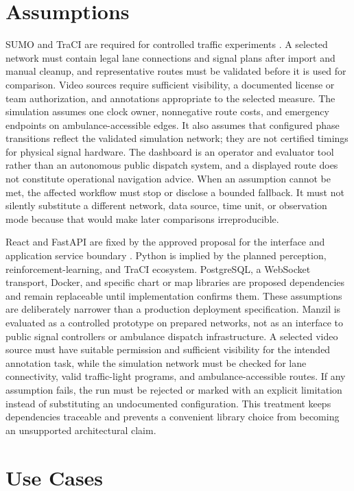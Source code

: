 \section{Assumptions}

SUMO and TraCI are required for controlled traffic experiments \cite{lopez2018sumo,sumodocs}. A selected network must contain legal lane connections and signal plans after import and manual cleanup, and representative routes must be validated before it is used for comparison. Video sources require sufficient visibility, a documented license or team authorization, and annotations appropriate to the selected measure. The simulation assumes one clock owner, nonnegative route costs, and emergency endpoints on ambulance-accessible edges. It also assumes that configured phase transitions reflect the validated simulation network; they are not certified timings for physical signal hardware. The dashboard is an operator and evaluator tool rather than an autonomous public dispatch system, and a displayed route does not constitute operational navigation advice. When an assumption cannot be met, the affected workflow must stop or disclose a bounded fallback. It must not silently substitute a different network, data source, time unit, or observation mode because that would make later comparisons irreproducible.

React and FastAPI are fixed by the approved proposal for the interface and application service boundary \cite{reactdocs,fastapidocs}. Python is implied by the planned perception, reinforcement-learning, and TraCI ecosystem. PostgreSQL, a WebSocket transport, Docker, and specific chart or map libraries are proposed dependencies and remain replaceable until implementation confirms them. These assumptions are deliberately narrower than a production deployment specification. Manzil is evaluated as a controlled prototype on prepared networks, not as an interface to public signal controllers or ambulance dispatch infrastructure. A selected video source must have suitable permission and sufficient visibility for the intended annotation task, while the simulation network must be checked for lane connectivity, valid traffic-light programs, and ambulance-accessible routes. If any assumption fails, the run must be rejected or marked with an explicit limitation instead of substituting an undocumented configuration. This treatment keeps dependencies traceable and prevents a convenient library choice from becoming an unsupported architectural claim.

\section{Use Cases}

